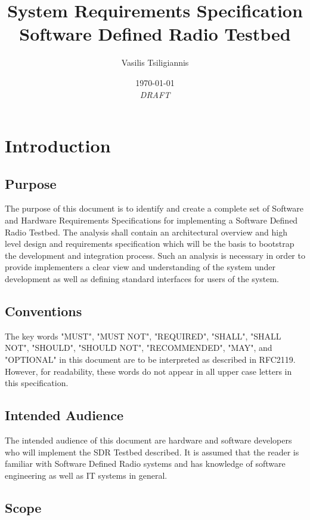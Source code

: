 \documentclass[english,titlepage,a4paper]{report}
\title{
  System Requirements Specification \\
  \large Software Defined Radio Testbed
}
\author{Vasilis Tsiligiannis}
\date{\today\\\textit{DRAFT}}
\begin{document}
\renewcommand*{\arraystretch}{2}
\maketitle
\tableofcontents


\chapter{Introduction}
\section{Purpose}

The purpose of this document is to identify and create a complete set of Software and Hardware Requirements Specifications for implementing a Software Defined Radio Testbed.
The analysis shall contain an architectural overview and high level design and requirements specification which will be the basis to bootstrap the development and integration process.
Such an analysis is necessary in order to provide implementers a clear view and understanding of the system under development as well as defining standard interfaces for users of the system.

\section{Conventions}

The key words "MUST", "MUST NOT", "REQUIRED", "SHALL", "SHALL NOT", "SHOULD", "SHOULD NOT", "RECOMMENDED", "MAY", and "OPTIONAL" in this document are to be interpreted as described in RFC2119. However, for readability, these words do not appear in all upper case letters in this specification.

\printglossary[type=definitions,numberedsection,style=definitions,nonumberlist]

\section{Intended Audience}

The intended audience of this document are hardware and software developers who will implement the SDR Testbed described.
It is assumed that the reader is familiar with Software Defined Radio systems and has knowledge of software engineering as well as IT systems in general.

\section{Scope}
\end{document}
